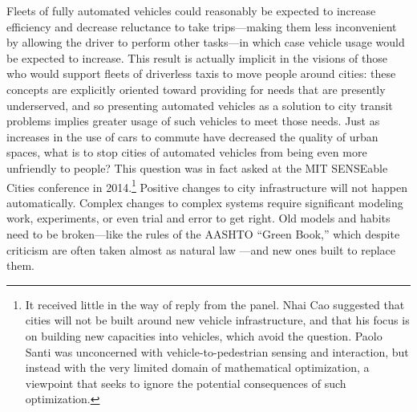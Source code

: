 Fleets of fully automated vehicles could reasonably be expected to increase
efficiency and decrease reluctance to take trips---making them
less inconvenient by allowing the driver to perform other tasks---in
which case vehicle usage would be expected to increase. This result is actually
implicit in the visions of those who would support fleets of
driverless taxis to move people around cities:  these concepts are
explicitly oriented toward providing for needs that are presently
underserved, and so presenting automated vehicles as a solution to
city transit problems implies greater usage of such vehicles to meet
those needs. Just as increases in the use of cars to commute have
decreased the quality of urban spaces, what is to stop cities of
automated vehicles from
being even more unfriendly to
people? This question was in fact asked at the MIT SENSEable Cities
conference in 2014.\footnote{It received little in the way of reply from the
panel. Nhai Cao suggested that cities will not be built around new
vehicle infrastructure, and that his focus is on building new
capacities into vehicles, which avoid the question. Paolo Santi was
unconcerned with vehicle-to-pedestrian sensing and interaction, but
instead with the very limited domain of mathematical optimization,
a viewpoint that seeks to ignore the potential consequences of such
optimization.} Positive changes to city infrastructure will not happen
automatically. Complex
changes to complex systems require significant modeling work,
experiments, or even trial and error to get right. Old models and
habits need to be broken---like the rules of the AASHTO ``Green
Book,'' which despite criticism are often taken almost as natural 
law \cite[p. 181, 183]{swopeTrenton}---and new ones built to replace them. 

